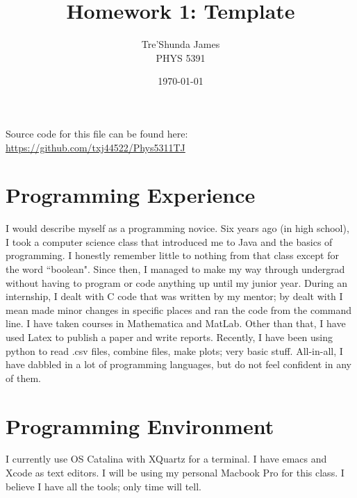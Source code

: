 \documentclass[12pt, letterpaper]{article} %
\begin{document}
\title{Homework 1: Template } %
\author{Tre'Shunda James\\PHYS 5391} %
\date{\today}%


\maketitle %
    \begin{center} %
    Source code for this file can be found here: \url{https://github.com/txj44522/Phys5311TJ}
    \end{center} %
\newpage %
\tableofcontents %
\newpage %


\section{Programming Experience} %
I would describe myself as a programming novice. Six years ago (in high school), I took a computer science class that introduced me to Java and the basics of programming. I honestly remember little to nothing from that class except for the word ``boolean". Since then, I managed to make my way through undergrad without having to program or code anything up until my junior year. During an internship, I dealt with C code that was written by my mentor; by dealt with I mean made minor changes in specific places and ran the code from the command line. I have taken courses in Mathematica and MatLab. Other than that, I have used Latex to publish a paper and write reports. Recently, I have been using python to read .csv files, combine files, make plots; very basic stuff. All-in-all, I have dabbled in a lot of programming languages, but do not feel confident in any of them. 
\section{Programming Environment}%
I currently use OS Catalina with XQuartz for a terminal. I have emacs and Xcode as text editors. I will be using my personal Macbook Pro for this class. I believe I have all the tools; only time will tell. 
\end{document}
